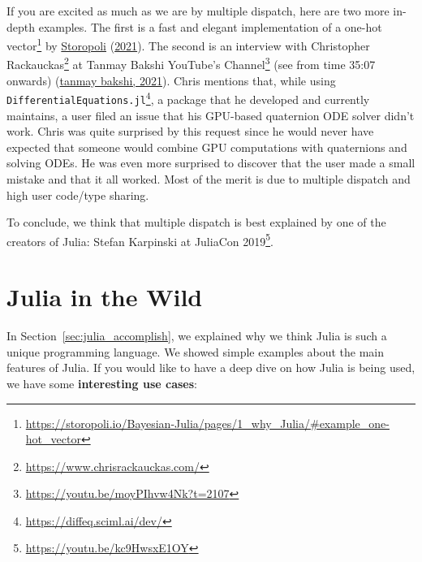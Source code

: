 \documentclass[
  notoc %
]{tufte-book}
\DeclareRobustCommand{\href}[2]{#2\footnote{\url{#1}}}
\newcommand{\passthrough}[1]{#1}
\begin{document}
If you are excited as much as we are by multiple dispatch, here are two
more in-depth examples. The first is a
\href{https://storopoli.io/Bayesian-Julia/pages/1_why_Julia/\#example_one-hot_vector}{fast
and elegant implementation of a one-hot vector} by
\protect\hyperlink{ref-storopoli2021bayesianjulia}{Storopoli}
(\protect\hyperlink{ref-storopoli2021bayesianjulia}{2021}). The second
is an interview with \href{https://www.chrisrackauckas.com/}{Christopher
Rackauckas} at \href{https://youtu.be/moyPIhvw4Nk?t=2107}{Tanmay Bakshi
YouTube's Channel} (see from time 35:07 onwards)
(\protect\hyperlink{ref-tanmaybakshiBakingKnowledgeMachine2021}{tanmay
bakshi, 2021}). Chris mentions that, while using
\href{https://diffeq.sciml.ai/dev/}{\passthrough{\lstinline!DifferentialEquations.jl!}},
a package that he developed and currently maintains, a user filed an
issue that his GPU-based quaternion ODE solver didn't work. Chris was
quite surprised by this request since he would never have expected that
someone would combine GPU computations with quaternions and solving
ODEs. He was even more surprised to discover that the user made a small
mistake and that it all worked. Most of the merit is due to multiple
dispatch and high user code/type sharing.

To conclude, we think that multiple dispatch is best explained by one of
the creators of Julia: \href{https://youtu.be/kc9HwsxE1OY}{Stefan
Karpinski at JuliaCon 2019}.

\hypertarget{sec:julia_wild}{%
\section{Julia in the Wild}\label{sec:julia_wild}}

In Section~\ref{sec:julia_accomplish}, we explained why we think Julia
is such a unique programming language. We showed simple examples about
the main features of Julia. If you would like to have a deep dive on how
Julia is being used, we have some \textbf{interesting use cases}:
\end{document}
